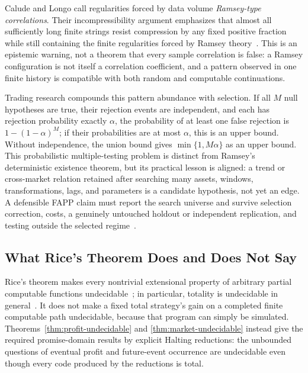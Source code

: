 \documentclass[aps,pra,reprint,superscriptaddress,amsmath,amssymb,floatfix]{revtex4-2}
\theoremstyle{plain}
\theoremstyle{definition}
\theoremstyle{remark}
\begin{document}
Calude and Longo call regularities forced by data volume \emph{Ramsey-type
correlations}. Their incompressibility argument emphasizes that almost all
sufficiently long finite strings resist compression by any fixed positive
fraction while still containing the finite regularities forced by Ramsey
theory~\cite{Calude2016}. This is an epistemic warning, not a theorem that every
sample correlation is false: a Ramsey configuration is not itself a
correlation coefficient, and a pattern observed in one finite history is
compatible with both random and computable continuations.

Trading research compounds this pattern abundance with selection. If all
\(M\) null hypotheses are true, their rejection events are independent, and
each has rejection probability exactly \(\alpha\), the probability of at least
one false rejection is
\(1-(1-\alpha)^M\); if their probabilities are at most \(\alpha\), this is an
upper bound. Without independence, the union bound gives
\(\min\{1,M\alpha\}\) as an upper bound. This
probabilistic multiple-testing problem is distinct from Ramsey's deterministic
existence theorem, but its practical lesson is aligned: a trend or cross-market
relation retained after searching many assets, windows, transformations, lags,
and parameters is a candidate hypothesis, not yet an edge. A defensible FAPP
claim must report the search universe and survive selection correction, costs,
a genuinely untouched holdout or independent replication, and testing outside
the selected regime~\cite{BaileyLopez2014}.

\subsection{What Rice's Theorem Does and Does Not Say}

Rice's theorem makes every nontrivial extensional property of arbitrary partial
computable functions undecidable~\cite{Rice-1953}; in particular, totality is
undecidable in general~\cite{turing-36}. It does not make a fixed total
strategy's gain on a completed finite computable path undecidable, because that
program can simply be simulated. Theorems~\ref{thm:profit-undecidable} and
\ref{thm:market-undecidable} instead give the required promise-domain results
by explicit Halting reductions: the unbounded questions of eventual profit and
future-event occurrence are undecidable even though every code produced by the
reductions is total.

\end{document}
